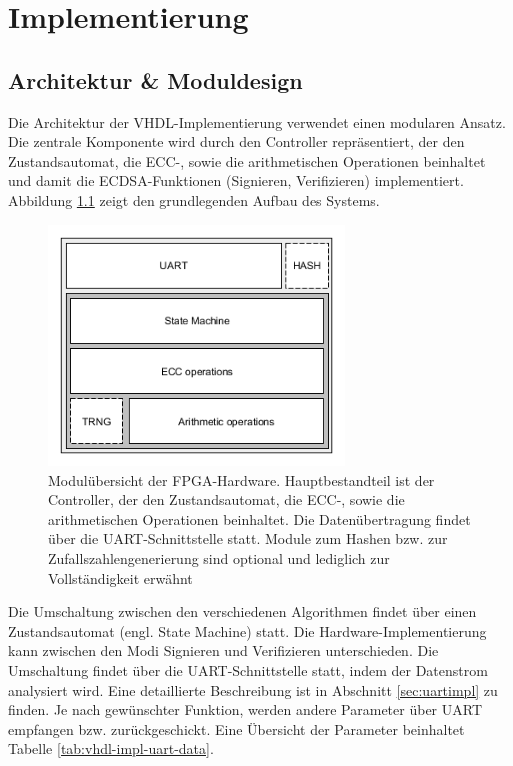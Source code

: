 
\chapter{Implementierung} \label{sec:impl}

\section{Architektur \& Moduldesign} 
\label{sec:march}
Die Architektur der VHDL-Implementierung verwendet einen modularen Ansatz. Die zentrale Komponente wird durch den Controller repräsentiert, der den Zustandsautomat, die ECC-, sowie die arithmetischen Operationen beinhaltet und damit die ECDSA-Funktionen (Signieren, Verifizieren)  implementiert. Abbildung \ref{fig:vhdl-impl-arch} zeigt den grundlegenden Aufbau des Systems.   

\begin{figure}[H]
	\centering
  	\includegraphics[width=0.7\textwidth]{bilder/vhdl_overview.png}
	\caption{Modulübersicht der FPGA-Hardware. Hauptbestandteil ist der Controller, der den Zustandsautomat, die ECC-, sowie die arithmetischen Operationen beinhaltet. Die Datenübertragung findet über die UART-Schnittstelle statt. Module zum Hashen bzw. zur Zufallszahlengenerierung sind optional und lediglich zur Vollständigkeit erwähnt}
	\label{fig:vhdl-impl-arch}
\end{figure}
 
Die Umschaltung zwischen den verschiedenen Algorithmen findet über einen Zustandsautomat (engl. State Machine) statt. Die Hardware-Implementierung kann zwischen den Modi Signieren und Verifizieren unterschieden. Die Umschaltung findet über die UART-Schnittstelle statt, indem der Datenstrom analysiert wird. Eine detaillierte Beschreibung ist in Abschnitt \ref{sec:uartimpl} zu finden. Je nach gewünschter Funktion, werden andere Parameter über UART empfangen bzw. zurückgeschickt. Eine Übersicht der Parameter beinhaltet Tabelle \ref{tab:vhdl-impl-uart-data}. \\

